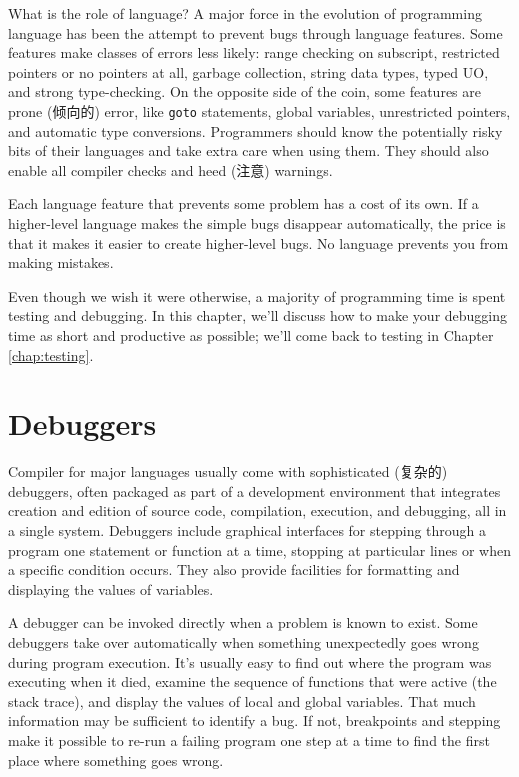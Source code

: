 What is the role of language? A major force in the evolution of programming
language has been the attempt to prevent bugs through language features.
Some features make classes of errors less likely: range checking on
subscript, restricted pointers or no pointers at all, garbage collection,
string data types, typed UO, and strong type-checking. On the opposite side
of the coin, some features are prone (倾向的) error, like \verb'goto'
statements, global variables, unrestricted pointers, and automatic type
conversions. Programmers should know the potentially risky bits of their
languages and take extra care when using them. They should also enable all
compiler checks and heed (注意) warnings.

Each language feature that prevents some problem has a cost of its own. If
a higher-level language makes the simple bugs disappear automatically, the
price is that it makes it easier to create higher-level bugs. No language
prevents you from making mistakes.

Even though we wish it were otherwise, a majority of programming time is
spent testing and debugging. In this chapter, we'll discuss how to make
your debugging time as short and productive as possible; we'll come back to
testing in Chapter \ref{chap:testing}.

\section{Debuggers}
\label{sec:debuggers}
Compiler for major languages usually come with sophisticated (复杂的)
debuggers, often packaged as part of a development environment that
integrates creation and edition of source code, compilation, execution, and
debugging, all in a single system. Debuggers include graphical interfaces
for stepping through a program one statement or function at a time,
stopping at particular lines or when a specific condition occurs. They also
provide facilities for formatting and displaying the values of variables.

A debugger can be invoked directly when a problem is known to exist. Some
debuggers take over automatically when something unexpectedly goes wrong
during program execution. It's usually easy to find out where the program
was executing when it died, examine the sequence of functions that were
active (the stack trace), and display the values of local and global
variables. That much information may be sufficient to identify a bug. If
not, breakpoints and stepping make it possible to re-run a failing program
one step at a time to find the first place where something goes wrong.

